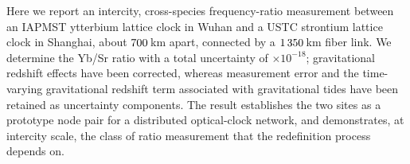 Here we report an intercity, cross-species frequency-ratio measurement
between an IAPMST ytterbium lattice clock in Wuhan and a USTC strontium
lattice clock in Shanghai, about $700$\,km apart, connected by a
$1\thinspace350$\,km fiber link. We determine the Yb/Sr ratio with a total
uncertainty of \uTotalE$\times10^{-18}$; gravitational redshift
effects have been corrected, whereas measurement error and the
time-varying gravitational redshift term associated with gravitational
tides have been retained as uncertainty components. The result
establishes the two sites as a prototype node pair for a distributed
optical-clock network, and demonstrates, at intercity scale, the
class of ratio measurement that the redefinition process depends on.
